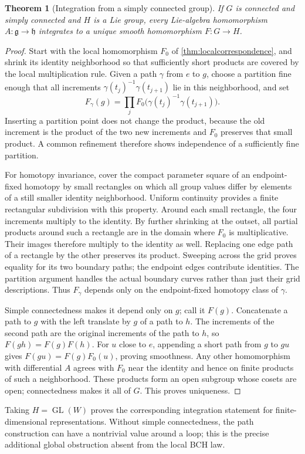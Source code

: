 \documentclass[11pt]{article}
\numberwithin{equation}{section}
\newtheorem{theorem}{Theorem}[section]
\theoremstyle{definition}
\theoremstyle{remark}
\DeclareMathOperator{\GL}{GL}
\newcommand{\g}{\mathfrak{g}}
\newcommand{\h}{\mathfrak{h}}
\begin{document}
\begin{theorem}[Integration from a simply connected group]
\label{thm:integration}
If $G$ is connected and simply connected and $H$ is a Lie group,
every Lie-algebra homomorphism $A:\g\to\h$ integrates to a unique
smooth homomorphism $F:G\to H$.
\end{theorem}
\begin{proof}
Start with the local homomorphism $F_0$ of
\cref{thm:localcorrespondence}, and shrink its identity neighborhood
so that sufficiently short products are covered by the local
multiplication rule. Given a path $\gamma$ from $e$ to $g$, choose a
partition fine enough that all increments
$\gamma(t_j)^{-1}\gamma(t_{j+1})$ lie in this neighborhood, and set
\[
 F_\gamma(g)=\prod_j
 F_0\bigl(\gamma(t_j)^{-1}\gamma(t_{j+1})\bigr).
\]
Inserting a partition point does not change the product, because
the old increment is the product of the two new increments and
$F_0$ preserves that small product. A common refinement therefore
shows independence of a sufficiently fine partition.

For homotopy invariance, cover the compact parameter square of an
endpoint-fixed homotopy by small rectangles on which all group
values differ by elements of a still smaller identity neighborhood.
Uniform continuity provides a finite rectangular subdivision with
this property. Around each small rectangle, the four increments
multiply to the identity. By further shrinking at the outset,
all partial products around such a rectangle are in the domain
where $F_0$ is multiplicative. Their images therefore multiply to
the identity as well. Replacing one edge path of a rectangle by the
other preserves its product. Sweeping across the grid proves equality
for its two boundary paths; the endpoint edges contribute identities.
The partition argument handles the actual boundary curves rather
than just their grid descriptions. Thus $F_\gamma$ depends only on
the endpoint-fixed homotopy class of $\gamma$.

Simple connectedness makes it depend only on $g$; call it $F(g)$.
Concatenate a path to $g$ with the left translate by $g$ of a path
to $h$. The increments of the second path are the original
increments of the path to $h$, so $F(gh)=F(g)F(h)$.
For $u$ close to $e$, appending a short path from $g$ to $gu$ gives
$F(gu)=F(g)F_0(u)$, proving smoothness. Any other homomorphism with
differential $A$ agrees with $F_0$ near the identity and hence on
finite products of such a neighborhood. These products form an
open subgroup whose cosets are open; connectedness makes it all
of $G$. This proves uniqueness.
\end{proof}
Taking $H=\GL(W)$ proves the corresponding integration statement for
finite-dimensional representations. Without simple connectedness,
the path construction can have a nontrivial value around a loop;
this is the precise additional global obstruction absent from the
local BCH law.
\end{document}
